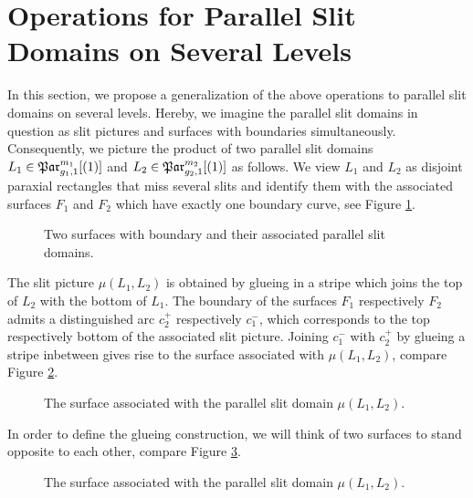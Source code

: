 \section{Operations for Parallel Slit Domains on Several Levels}
\label{homology_operations:glueing_construction}
In this section, we propose a generalization of the above operations to parallel slit domains on several levels.
Hereby, we imagine the parallel slit domains in question as slit pictures and surfaces with boundaries simultaneously.
Consequently, we picture the product of two parallel slit domains $L_1 \in \mathfrak{Par}_{g_1,1}^{m_1}[(1)]$ and $L_2 \in \mathfrak{Par}_{g_2,1}^{m_2}[(1)]$ as follows.
We view $L_1$ and $L_2$ as disjoint paraxial rectangles that miss several slits and identify them with the associated surfaces $F_1$ and $F_2$ which have exactly one boundary curve,
see Figure \ref{homology_operations:parallel_patching_slit_pics:general_glueing_two_slit_pics_and_surfaces}.
\begin{figure}[ht]
    \centering
    \def\svgwidth{.7\columnwidth}
    
    \caption{\label{homology_operations:parallel_patching_slit_pics:general_glueing_two_slit_pics_and_surfaces}Two surfaces with boundary and their associated parallel slit domains.}
\end{figure}

The slit picture $\mu(L_1, L_2)$ is obtained by glueing in a stripe which joins the top of $L_2$ with the bottom of $L_1$.
\label{page:glueing_construction_arcs_c_plus_and_c_minus}%
The boundary of the surfaces $F_1$ respectively $F_2$ admits a distinguished arc $c_2^+$ respectively $c_1^-$,
which corresponds to the top respectively bottom of the associated slit picture.
Joining $c_1^-$ with $c_2^+$ by glueing a stripe inbetween gives rise to the surface associated with $\mu(L_1, L_2)$,
compare Figure \ref{homology_operations:parallel_patching_slit_pics:general_glueing_two_slit_pics_and_surfaces_glued}.
\begin{figure}[ht]
    \centering
    \def\svgwidth{.8\columnwidth}
    
    \caption{\label{homology_operations:parallel_patching_slit_pics:general_glueing_two_slit_pics_and_surfaces_glued}The surface associated with the parallel slit domain $\mu(L_1, L_2)$.}
\end{figure}
In order to define the glueing construction, we will think of two surfaces to stand opposite to each other,
compare Figure \ref{homology_operations:parallel_patching_slit_pics:general_glueing_two_surfaces_glued_untwisted}.
\begin{figure}[ht]
    \centering
    \def\svgwidth{.8\columnwidth}
    
    \caption{\label{homology_operations:parallel_patching_slit_pics:general_glueing_two_surfaces_glued_untwisted}The surface associated with the parallel slit domain $\mu(L_1, L_2)$.}
\end{figure}

